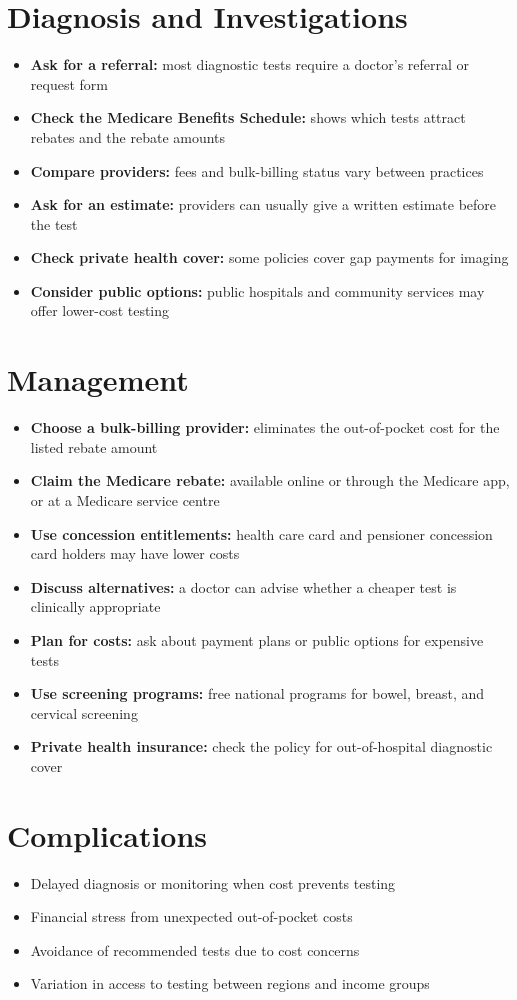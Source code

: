 \section*{Diagnosis and Investigations}
\begin{itemize}
    \item \textbf{Ask for a referral:} most diagnostic tests require a doctor's referral or request form
    \item \textbf{Check the Medicare Benefits Schedule:} shows which tests attract rebates and the rebate amounts
    \item \textbf{Compare providers:} fees and bulk-billing status vary between practices
    \item \textbf{Ask for an estimate:} providers can usually give a written estimate before the test
    \item \textbf{Check private health cover:} some policies cover gap payments for imaging
    \item \textbf{Consider public options:} public hospitals and community services may offer lower-cost testing
\end{itemize}

\section*{Management}
\begin{itemize}
    \item \textbf{Choose a bulk-billing provider:} eliminates the out-of-pocket cost for the listed rebate amount
    \item \textbf{Claim the Medicare rebate:} available online or through the Medicare app, or at a Medicare service centre
    \item \textbf{Use concession entitlements:} health care card and pensioner concession card holders may have lower costs
    \item \textbf{Discuss alternatives:} a doctor can advise whether a cheaper test is clinically appropriate
    \item \textbf{Plan for costs:} ask about payment plans or public options for expensive tests
    \item \textbf{Use screening programs:} free national programs for bowel, breast, and cervical screening
    \item \textbf{Private health insurance:} check the policy for out-of-hospital diagnostic cover
\end{itemize}

\section*{Complications}
\begin{itemize}
    \item Delayed diagnosis or monitoring when cost prevents testing
    \item Financial stress from unexpected out-of-pocket costs
    \item Avoidance of recommended tests due to cost concerns
    \item Variation in access to testing between regions and income groups
\end{itemize}


